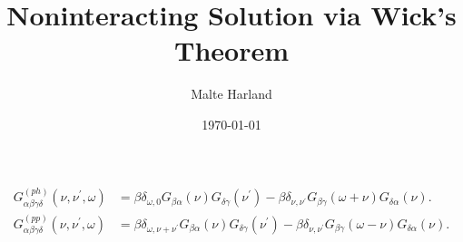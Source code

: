\documentclass[12pt]{article}
\title{Noninteracting Solution via Wick's Theorem}
\date{\today}
\author{Malte Harland}
\begin{document}
\maketitle
\begin{align}
  G^{(ph)}_{\alpha\beta\gamma\delta}(\nu,\nu^\prime,\omega) &= \beta \delta_{\omega,0} G_{\beta \alpha}(\nu) G_{\delta \gamma}(\nu^\prime) - \beta \delta_{\nu,\nu^\prime} G_{\beta \gamma}(\omega + \nu) G_{\delta \alpha}(\nu).\\
  G^{(pp)}_{\alpha\beta\gamma\delta}(\nu,\nu^\prime,\omega) &= \beta \delta_{\omega,\nu+\nu^\prime} G_{\beta \alpha}(\nu) G_{\delta \gamma}(\nu^\prime) - \beta \delta_{\nu,\nu^\prime} G_{\beta \gamma}(\omega - \nu) G_{\delta \alpha}(\nu).
\end{align}
\end{document}
